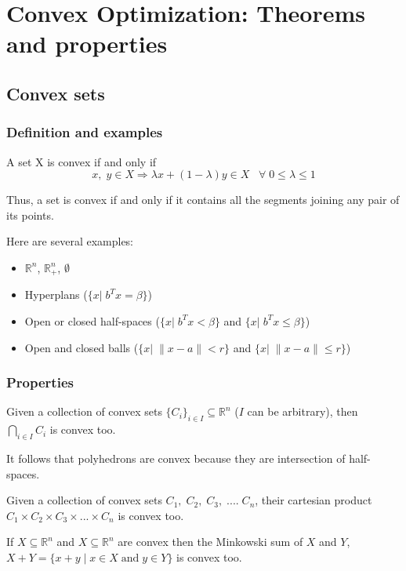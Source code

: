 \section{Convex Optimization: Theorems and properties}
\subsection{Convex sets}

\subsubsection{Definition and examples}
\begin{definition}
A set X is convex if and only if
$$x,\;y \in X \Rightarrow \lambda x +(1-\lambda )y \in X \;\;\; \forall \; 0 \le \lambda \le 1$$
\end{definition}

Thus, a set is convex if and only if it contains all the segments joining any pair of its points.

\begin{example}
\begin{leftbar}
Here are several examples:
\begin{itemize}
\item $\mathbb{R}^n$, $\mathbb{R}^n_+$, $\emptyset$
\item Hyperplans ($\{x|\; b^Tx=\beta\}$)
\item Open or closed half-spaces ($\{x|\;b^Tx<\beta\}$ and $\{x| \;b^Tx\le \beta\}$)
\item Open and closed balls ($\{x|\;\|x-a\|<r\}$ and $\{x|\;\|x-a\|\leq r \}$)
\end{itemize}
\end{leftbar}
\end{example}

\subsubsection{Properties}
\begin{property}
Given a collection of convex sets $\{C_i\}_{i \in I} \subseteq \mathbb{R}^n$ ($I$ can be arbitrary), then $\bigcap \limits _{i \in I}C_i$ is convex too.
\end{property}
It follows that polyhedrons are convex because they are intersection of half-spaces.\\

\begin{property}
Given a collection of convex sets $C_1,\; C_2,\; C_3,\; ....\;C_n$, their cartesian product $C_1\times C_2 \times C_3 \times ... \times C_n$ is convex too. 
\end{property}
\vspace{0.5cm}
\begin{property}
If $X\subseteq \mathbb{R}^n$ and $X\subseteq \mathbb{R}^n$ are convex then the Minkowski sum of $X$ and $Y$, $X+Y=\{x+y\;|\;x \in X \;\text{and} \; y \in Y\}$ is convex too. 
\end{property}

